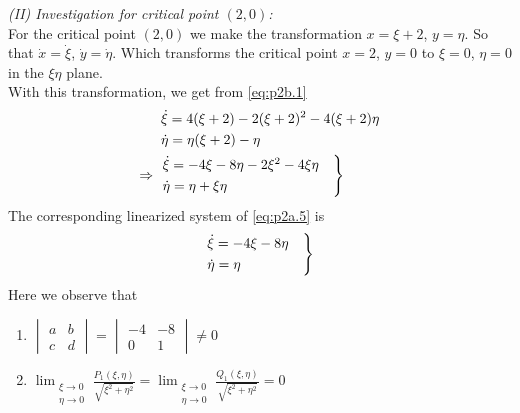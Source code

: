 \documentclass[../main-sheet.tex]{subfiles}
\begin{document}
\begin{soln}[b]
    
    \emph{(II) Investigation for critical point \((2,0)\):}\\
    For the critical point \((2,0)\) we make the transformation \(x=\xi+2\), \(y=\eta\). So that \(\dot{x}=\dot{\xi}\), \(\dot{y}=\dot{\eta}\). Which transforms the critical point \(x=2\), \(y=0\) to \(\xi=0\), \(\eta=0\) in the \(\xi\eta\) plane.\\
    With this transformation, we get from \eqref{eq:p2b.1}
    \begin{align}
        &\dot{\xi}=4(\xi+2)-2(\xi+2)^2-4(\xi+2)\eta\notag\\
        &\dot{\eta}=\eta(\xi+2)-\eta\notag\\
        \Rightarrow\;\;&\begin{aligned}
            \begin{rcases}
                \dot{\xi}=-4\xi-8\eta-2\xi^2-4\xi\eta\quad\\
                \dot{\eta}=\eta+\xi\eta
            \end{rcases}
        \end{aligned}\label{eq:p2b.5}
    \end{align}
    The corresponding linearized system of \eqref{eq:p2a.5} is 
    \begin{equation}
        \begin{rcases}
            \dot{\xi}=-4\xi-8\eta\quad\\
            \dot{\eta}=\eta\quad
        \end{rcases}
        \label{eq:p2b.6}
    \end{equation}
    Here we observe that
    \begin{enumerate}[label=(\roman*)]
        \item \(\begin{vmatrix}
            a&b\\
            c&d
        \end{vmatrix}=\begin{vmatrix}
            -4&-8\\
            0&1
        \end{vmatrix}\neq 0\)
        \item \(\displaystyle\lim_{\substack{\xi\to 0 \\ \eta\to 0}} \frac{P_1(\xi,\eta)}{\sqrt{\xi^2+\eta^2}}=\lim_{\substack{\xi\to 0 \\ \eta\to 0}} \frac{Q_1(\xi,\eta)}{\sqrt{\xi^2+\eta^2}}=0\)\\ 
        

\end{enumerate}
\end{soln}
\end{document}
